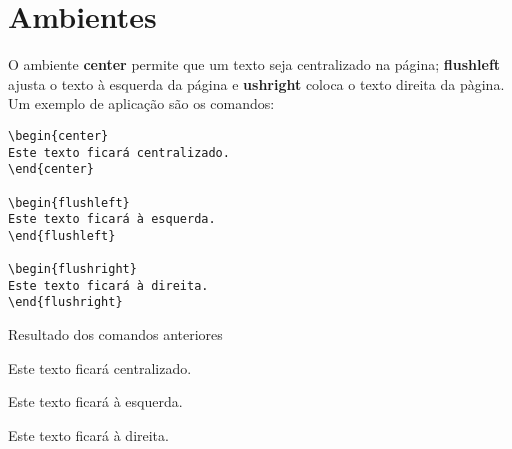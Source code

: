 \section{Ambientes}

\begin{frame}[fragile]
O ambiente {\bf center} permite que um texto seja centralizado na página;
{\bf flushleft} ajusta o texto à esquerda da página e {\bf ushright} coloca o texto
direita da pàgina. Um exemplo de aplicação são os comandos:
\begin{verbatim}
\begin{center}
Este texto ficará centralizado.
\end{center}

\begin{flushleft}
Este texto ficará à esquerda.
\end{flushleft}

\begin{flushright}
Este texto ficará à direita.
\end{flushright}
\end{verbatim}
\end{frame}


\begin{frame}
\begin{block}{Resultado dos comandos anteriores}
\end{block}

\begin{center}
Este texto ficará centralizado.
\end{center}

\begin{flushleft}
Este texto ficará à esquerda.
\end{flushleft}

\begin{flushright}
Este texto ficará à direita.
\end{flushright}
\end{frame}


